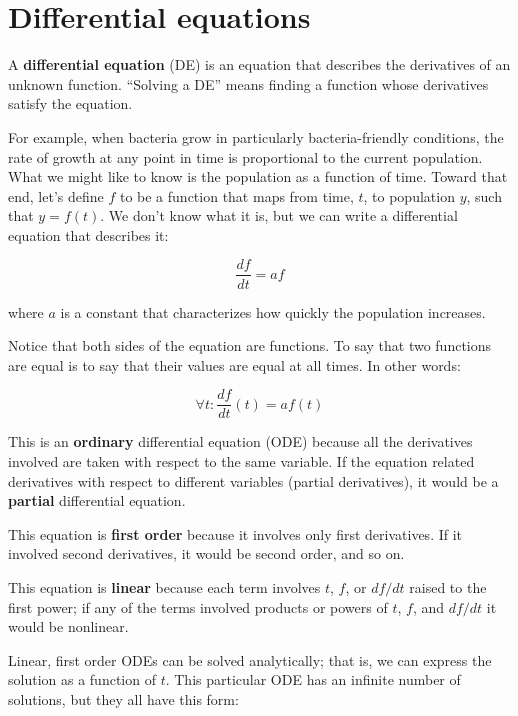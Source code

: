 \documentclass[
]{book}
\begin{document}
\section{Differential equations}

A {\bf differential equation} (DE) is an equation that describes the
derivatives of an unknown function.  ``Solving a DE'' means finding a
function whose derivatives satisfy the equation.

For example, when bacteria grow in particularly bacteria-friendly
conditions, the rate of growth at any point in time is proportional to
the current population.  What we might like to know is the population
as a function of time.  Toward that end, let's define $f$ to be a
function that maps from time, $t$, to population $y$,
such that $y = f(t)$.  We don't
know what it is, but we can write a differential equation
that describes it:

\begin{equation}\label{eq:exp_growth}
\frac{df}{dt} = a f
\end{equation}

where $a$ is a constant that characterizes how quickly the population
increases.

Notice that both sides of the equation are functions.  To say that
two functions are equal is to say that their values are equal at
all times.  In other words:

\begin{equation}
\forall t: \frac{df}{dt}(t) = a f(t)
\end{equation}

This is an {\bf ordinary} differential equation (ODE) because all the
derivatives involved are taken with respect to the
same variable.  If the equation related derivatives with respect to
different variables (partial derivatives), it would be a {\bf partial}
differential equation.

This equation is {\bf first order} because it involves only first
derivatives.  If it involved second derivatives, it would be second order,
and so on.

This equation is {\bf linear} because each term involves $t$, $f$, or
$df/dt$ raised to the first power; if any of the terms involved
products or powers of $t$, $f$, and $df/dt$ it would be
nonlinear.

Linear, first order ODEs can be solved analytically; that is, we
can express the solution as a function of $t$.
This particular ODE has an infinite number of solutions, but
they all have this form:
\end{document}
